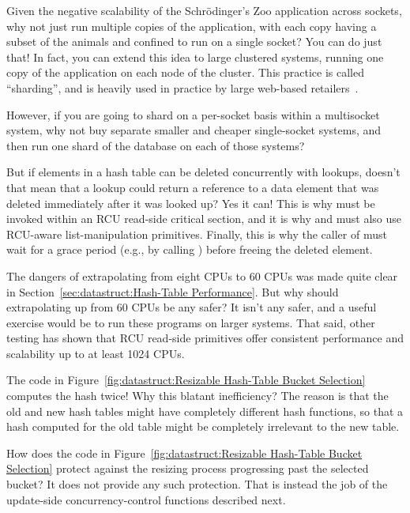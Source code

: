 \begin{enumerate}
\QuickQ{}
	Given the negative scalability of the Schr\"odinger's
	Zoo application across sockets, why not just run multiple
	copies of the application, with each copy having a subset
	of the animals and confined to run on a single socket?
\QuickA{}
	You can do just that!
	In fact, you can extend this idea to large clustered systems,
	running one copy of the application on each node of the cluster.
	This practice is called ``sharding'', and is heavily used in
	practice by large web-based
	retailers~\cite{DeCandia:2007:DAH:1323293.1294281}.

	However, if you are going to shard on a per-socket basis within
	a multisocket system, why not buy separate smaller and cheaper
	single-socket systems, and then run one shard of the database
	on each of those systems?

\QuickQ{}
	But if elements in a hash table can be deleted concurrently
	with lookups, doesn't that mean that a lookup could return
	a reference to a data element that was deleted immediately
	after it was looked up?
\QuickA{}
	Yes it can!
	This is why  must be invoked within an
	RCU read-side critical section, and it is why
	 and  must also use
	RCU-aware list-manipulation primitives.
	Finally, this is why the caller of  must
	wait for a grace period (e.g., by calling )
	before freeing the deleted element.

\QuickQ{}
	The dangers of extrapolating from eight CPUs to 60 CPUs was
	made quite clear in
	Section~\ref{sec:datastruct:Hash-Table Performance}.
	But why should extrapolating up from 60 CPUs be any safer?
\QuickA{}
	It isn't any safer, and a useful exercise would be to run these
	programs on larger systems.
	That said, other testing has shown that RCU read-side primitives
	offer consistent performance and scalability up to at least 1024 CPUs.

\QuickQ{}
	The code in
	Figure~\ref{fig:datastruct:Resizable Hash-Table Bucket Selection}
	computes the hash twice!
	Why this blatant inefficiency?
\QuickA{}
	The reason is that the old and new hash tables might have
	completely different hash functions, so that a hash computed
	for the old table might be completely irrelevant to the
	new table.

\QuickQ{}
	How does the code in
	Figure~\ref{fig:datastruct:Resizable Hash-Table Bucket Selection}
	protect against the resizing process progressing past the
	selected bucket?
\QuickA{}
	It does not provide any such protection.
	That is instead the job of the update-side concurrency-control
	functions described next.


\end{enumerate}
